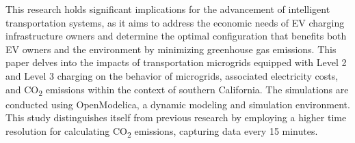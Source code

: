 \documentclass[conference]{IEEEtran}
\begin{document}
		This research holds significant implications for the advancement of intelligent transportation systems, as it aims to address the economic needs of EV charging infrastructure owners and determine the optimal configuration that benefits both EV owners and the environment by minimizing greenhouse gas emissions. This paper delves into the impacts of transportation microgrids equipped with Level 2 and Level 3 charging on the behavior of microgrids, associated electricity costs, and CO\textsubscript{2} emissions within the context of southern California. The simulations are conducted using OpenModelica, a dynamic modeling and simulation environment. This study distinguishes itself from previous research by employing a higher time resolution for calculating CO\textsubscript{2} emissions, capturing data every 15 minutes.
		
\end{document}
